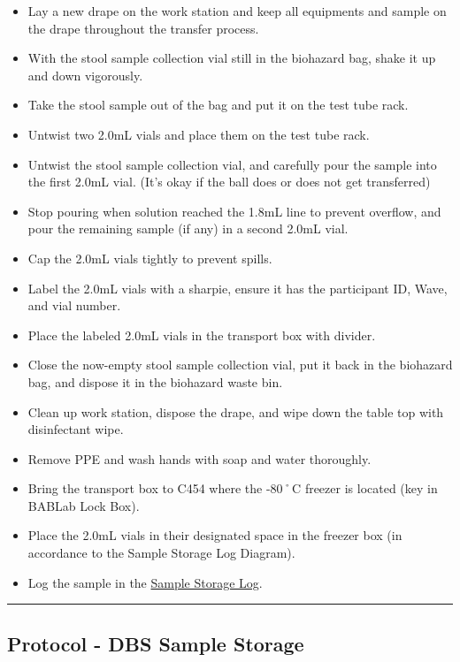 \documentclass[]{book}
\providecommand{\tightlist}{%
  \setlength{\itemsep}{0pt}\setlength{\parskip}{0pt}}
\begin{document}
\begin{itemize}
\tightlist
\item
  Lay a new drape on the work station and keep all equipments and sample on the drape throughout the transfer process.
\item
  With the stool sample collection vial still in the biohazard bag, shake it up and down vigorously.
\item
  Take the stool sample out of the bag and put it on the test tube rack.
\item
  Untwist two 2.0mL vials and place them on the test tube rack.
\item
  Untwist the stool sample collection vial, and carefully pour the sample into the first 2.0mL vial. (It's okay if the ball does or does not get transferred)
\item
  Stop pouring when solution reached the 1.8mL line to prevent overflow, and pour the remaining sample (if any) in a second 2.0mL vial.
\item
  Cap the 2.0mL vials tightly to prevent spills.
\item
  Label the 2.0mL vials with a sharpie, ensure it has the participant ID, Wave, and vial number.
\item
  Place the labeled 2.0mL vials in the transport box with divider.
\item
  Close the now-empty stool sample collection vial, put it back in the biohazard bag, and dispose it in the biohazard waste bin.
\item
  Clean up work station, dispose the drape, and wipe down the table top with disinfectant wipe.
\item
  Remove PPE and wash hands with soap and water thoroughly.
\item
  Bring the transport box to C454 where the -80˚C freezer is located (key in BABLab Lock Box).
\item
  Place the 2.0mL vials in their designated space in the freezer box (in accordance to the Sample Storage Log Diagram).
\item
  Log the sample in the \href{https://app.box.com/file/630322897864}{Sample Storage Log}.
\end{itemize}

\begin{center}\rule{0.5\linewidth}{0.5pt}\end{center}

\hypertarget{protocol---dbs-sample-storage}{%
\subsection{Protocol - DBS Sample Storage}\label{protocol---dbs-sample-storage}}
\end{document}
